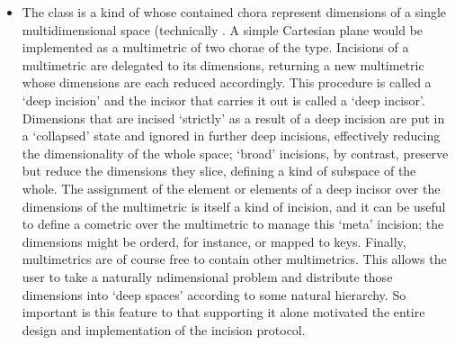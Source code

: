 \documentclass[letterpaper,10pt,english]{jupyterBook}
\begin{document}
\begin{itemize}
\begin{itemize}
\item {} 
\sphinxAtStartPar
The  class is a kind of  whose contained chora represent dimensions of a single multidimensional space (technically . A simple Cartesian plane would be implemented as a multimetric of two chorae of the  type. Incisions of a multimetric are delegated to its dimensions, returning a new multimetric whose dimensions are each reduced accordingly. This procedure is called a ‘deep incision’ and the incisor that carries it out is called a ‘deep incisor’. Dimensions that are incised ‘strictly’ as a result of a deep incision are put in a ‘collapsed’ state and ignored in further deep incisions, effectively reducing the dimensionality of the whole space; ‘broad’ incisions, by contrast, preserve but reduce the dimensions they slice, defining a kind of subspace of the whole. The assignment of the element or elements of a deep incisor over the dimensions of the multimetric is itself a kind of incision, and it can be useful to define a cometric over the multimetric to manage this ‘meta’ incision; the dimensions might be orderd, for instance, or mapped to keys. Finally, multimetrics are of course free to contain other multimetrics. This allows the user to take a naturally n\sphinxhyphen{}dimensional problem and distribute those dimensions into ‘deep spaces’ according to some natural hierarchy. So important is this feature to  that supporting it alone motivated the entire design and implementation of the incision protocol.

\end{itemize}

\end{itemize}
\end{document}

